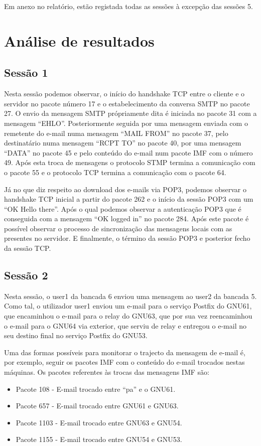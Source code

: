 \documentclass[a4paper,12pt]{article}
\begin{document}
Em anexo no relatório, estão registada todas as sessões à excepção das
sessões 5.

\section{Análise de resultados}

\subsection{Sessão 1}

Nesta sessão podemos observar, o início do handshake TCP entre o cliente
e o servidor no pacote número 17 e o estabelecimento da conversa SMTP
no pacote 27. O envio da mensagem SMTP própriamente dita é iniciada no pacote
31 com a mensagem ``EHLO''. Posteriormente seguida por uma mensagem enviada
com o remetente do e-mail numa mensagem ``MAIL FROM'' no pacote 37, pelo 
destinatário numa mensagem ``RCPT TO'' no pacote 40, por uma mensagem ``DATA'' 
no pacote 45 e pelo conteúdo do e-mail num pacote IMF com o número 49. Após
esta troca de mensagens o protocolo STMP termina a comunicação com o pacote 55 e
o protocolo TCP termina a comunicação com o pacote 64.

Já no que diz respeito ao download dos e-mails via POP3, podemos observar
o handshake TCP inicial a partir do pacote 262 e o início da sessão POP3
com um ``OK Hello there''. Após o qual podemos observar a autenticação
POP3 que é conseguida com a mensagem ``OK logged in'' no pacote 284. Após este
pacote é possível observar o processo de sincronização das mensagens
locais com as presentes no servidor. E finalmente, o término da sessão POP3
e posterior fecho da sessão TCP.

\subsection{Sessão 2}

Nesta sessão, o user1 da bancada 6 enviou uma mensagem ao user2 da bancada 5.
Como tal, o utilizador user1 enviou um e-mail para o serviço Postfix do
GNU61, que encaminhou o e-mail para o relay do GNU63,
que por sua vez reencaminhou o e-mail para o GNU64 via exterior, que serviu de relay
e entregou o e-mail no seu destino final no serviço Postfix do GNU53.

Uma das formas possíveis para monitorar o trajecto da mensagem de e-mail é,
por exemplo, seguir os pacotes IMF com o conteúdo do e-mail trocados nestas 
máquinas. Os pacotes referentes às trocas das mensagens IMF são:
\begin{itemize}
	\item Pacote 108 - E-mail trocado entre ``pa'' e o GNU61.
	\item Pacote 657 - E-mail trocado entre GNU61 e GNU63.
	\item Pacote 1103 - E-mail trocado entre GNU63 e GNU54.
	\item Pacote 1155 - E-mail trocado entre GNU54 e GNU53.
\end{itemize}
\end{document}
